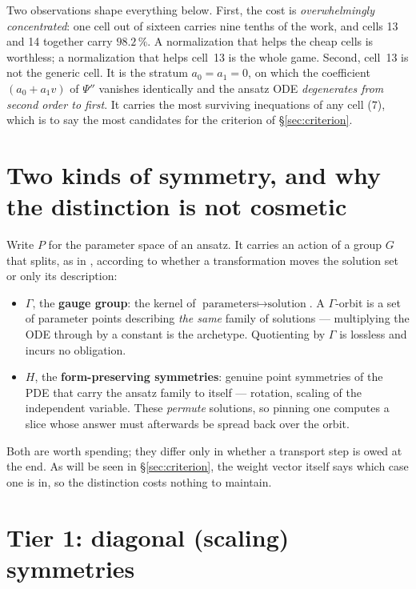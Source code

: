 \documentclass[11pt]{article}
\theoremstyle{plain}
\theoremstyle{definition}
\theoremstyle{remark}
\begin{document}
Two observations shape everything below. First, the cost is
\emph{overwhelmingly concentrated}: one cell out of sixteen carries nine tenths
of the work, and cells 13 and 14 together carry $98.2\,\%$. A normalization
that helps the cheap cells is worthless; a normalization that helps cell~13 is
the whole game. Second, cell~13 is not the generic cell. It is the stratum
$a_0 = a_1 = 0$, on which the coefficient $(a_0 + a_1 v)$ of $\Psi''$ vanishes
identically and the ansatz ODE \emph{degenerates from second order to first}.
It carries the most surviving inequations of any cell ($7$), which is to say the
most candidates for the criterion of \S\ref{sec:criterion}.

\section{Two kinds of symmetry, and why the distinction is not cosmetic}
\label{sec:twokinds}

Write $P$ for the parameter space of an ansatz. It carries an action of a group
$G$ that splits, as in \cite{ansatz25}, according to whether a transformation
moves the solution set or only its description:

\begin{itemize}
\item $\Gamma$, the \textbf{gauge group}: the kernel of
      $\text{parameters} \mapsto \text{solution}$. A $\Gamma$-orbit is a set of
      parameter points describing \emph{the same} family of solutions ---
      multiplying the ODE through by a constant is the archetype. Quotienting
      by $\Gamma$ is lossless and incurs no obligation.
\item $H$, the \textbf{form-preserving symmetries}: genuine point symmetries of
      the PDE that carry the ansatz family to itself --- rotation, scaling of
      the independent variable. These \emph{permute} solutions, so pinning one
      computes a slice whose answer must afterwards be spread back over the
      orbit.
\end{itemize}

Both are worth spending; they differ only in whether a transport step is owed
at the end. As will be seen in \S\ref{sec:criterion}, the weight vector itself
says which case one is in, so the distinction costs nothing to maintain.

\section{Tier 1: diagonal (scaling) symmetries}
\label{sec:tier1}
\end{document}
